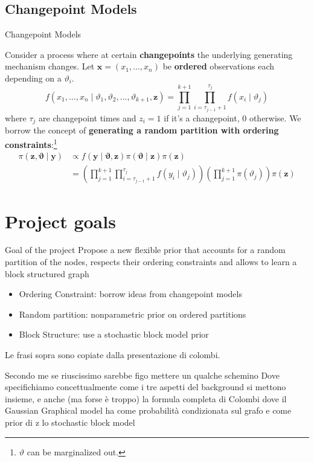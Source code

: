 \subsection{Changepoint Models}
\begin{frame}{Changepoint Models}

    Consider a process where at certain \textbf{changepoints} the underlying generating mechanism changes. Let $\mathbf{x}=(x_{1},\ldots,x_{n})$ be \textbf{ordered} observations each depending on a $\vartheta_{i}.$\\
    \[
        f(x_{1},\ldots,x_{n} \mid \vartheta_1, \vartheta_2, \ldots, \vartheta_{k+1}, \boldsymbol{z})=\prod_{j=1}^{k+1} \prod_{i=\tau_{j-1}+1}^{\tau_j} f(x_i \mid \vartheta_j)
    \]
    where $\tau_j$ are changepoint times and $z_{i} = 1$ if it's a changepoint, $0$ otherwise.
    We borrow the concept of \textbf{generating a random partition with ordering constraints}:\footnote{$\vartheta$ can be marginalized out.}
    \begin{align*}
        \pi(\mathbf{z}, \mathbf{\vartheta} \mid \mathbf{y}) & \propto f(\mathbf{y} \mid \mathbf{\vartheta}, \mathbf{z}) \pi(\mathbf{\vartheta} \mid \mathbf{z}) \pi(\mathbf{z}) \\
        &=\left(\prod_{j=1}^{k+1} \prod_{i=\tau_{j-1}+1}^{\tau_j} f(y_i \mid \vartheta_j)\right)\left(\prod_{j=1}^{k+1} \pi(\vartheta_j)\right) \pi(\mathbf{z})
    \end{align*}
    

\end{frame}


\section{Project goals}


\begin{frame}[containsverbatim]{Goal of the project}
Propose a \alert {new flexible prior that accounts for a random partition of the nodes}, respects their ordering constraints and allows to learn a block structured graph

 \begin{itemize}
     \item Ordering Constraint: borrow ideas from changepoint models
     \item Random partition: nonparametric prior on ordered partitions
     \item Block Structure: use a stochastic block model prior
 \end{itemize}


Le frasi sopra sono copiate dalla presentazione di colombi.

Secondo me se riuscissimo sarebbe figo mettere un qualche schemino  Dove specifichiamo concettualmente come i tre aspetti del background si mettono insieme, 
e anche (ma forse è troppo) la formula completa di Colombi dove il Gaussian Graphical model ha come probabilità condizionata sul grafo e come prior di z lo stochastic block model

\end{frame}

